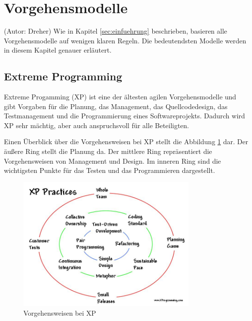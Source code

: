\section{Vorgehensmodelle}
(Autor: Dreher)
Wie in Kapitel \ref{sec:einfuehrung} beschrieben, basieren alle Vorgehensmodelle auf wenigen klaren Regeln. Die bedeutendsten Modelle werden in diesem Kapitel genauer erläutert.

\subsection{Extreme Programming}
Extreme Progamming (XP) ist eine der ältesten agilen Vorgehensmodelle und gibt Vorgaben für die Planung, das Management, das Quellcodedesign, das Testmanagement und die Programmierung eines Softwareprojekts. Dadurch wird XP sehr mächtig, aber auch anspruchsvoll für alle Beteiligten. \cite[S. 13]{bib:wolfRoock} \cite{bib:xp}

Einen Überblick über die Vorgehensweisen bei XP stellt die Abbildung \ref{fig:xppractices} dar. Der äußere Ring stellt die Planung da. Der mittlere Ring repräsentiert die Vorgehensweisen von Management und Design. Im inneren Ring sind die wichtigsten Punkte für das Testen und das Programmieren dargestellt.

\begin{figure}[h]
  \centering
  \includegraphics[width=0.8\textwidth]{images/xpCircles}
  \caption{Vorgehensweisen bei XP \cite{bib:xprogamming}}
  \label{fig:xppractices}
\end{figure}

